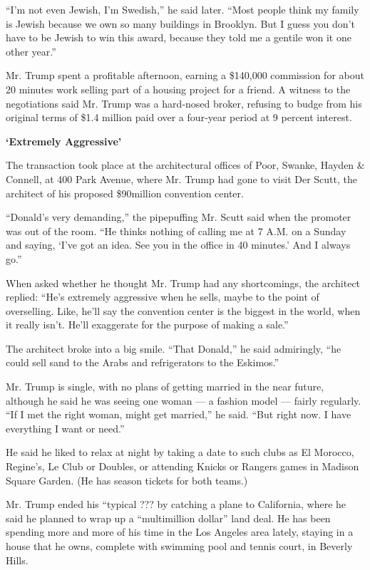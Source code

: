 ``I'm not even Jewish, I'm Swedish,'' he said later. ``Most people think
my family is Jewish because we own so many buildings in Brooklyn. But I
guess you don't have to be Jewish to win this award, because they told
me a gentile won it one other year.''

Mr. Trump spent a profitable afternoon, earning a \$140,000 commission
for about 20 minutes work selling part of a housing project for a
friend. A witness to the negotiations said Mr. Trump was a hard‐nosed
broker, refusing to budge from his original terms of \$1.4 million paid
over a four‐year period at 9 percent interest.

\textbf{`Extremely Aggressive'}

The transaction took place at the architectural offices of Poor, Swanke,
Hayden \& Connell, at 400 Park Avenue, where Mr. Trump had gone to visit
Der Scutt, the architect of his proposed \$90million convention center.

``Donald's very demanding,'' the pipepuffing Mr. Scutt said when the
promoter was out of the room. ``He thinks nothing of calling me at 7
A.M. on a Sunday and saying, `I've got an idea. See you in the office in
40 minutes.' And I always go.''

When asked whether he thought Mr. Trump had any shortcomings, the
architect replied: ``He's extremely aggressive when he sells, maybe to
the point of overselling. Like, he'll say the convention center is the
biggest in the world, when it really isn't. He'll exaggerate for the
purpose of making a sale.''

The architect broke into a big smile. ``That Donald,'' he said
admiringly, ``he could sell sand to the Arabs and refrigerators to the
Eskimos.''

Mr. Trump is single, with no plans of getting married in the near
future, although he said he was seeing one woman --- a fashion model ---
fairly regularly. ``If I met the right woman, might get married,'' he
said. ``But right now. I have everything I want or need.''

He said he liked to relax at night by taking a date to such clubs as El
Morocco, Regine's, Le Club or Doubles, or attending Knicks or Rangers
games in Madison Square Garden. (He has season tickets for both teams.)

Mr. Trump ended his ``typical ??? by catching a plane to California,
where he said he planned to wrap up a ``multimillion dollar'' land deal.
He has been spending more and more of his time in the Los Angeles area
lately, staying in a house that he owns, complete with swimming pool and
tennis court, in Beverly Hills.

